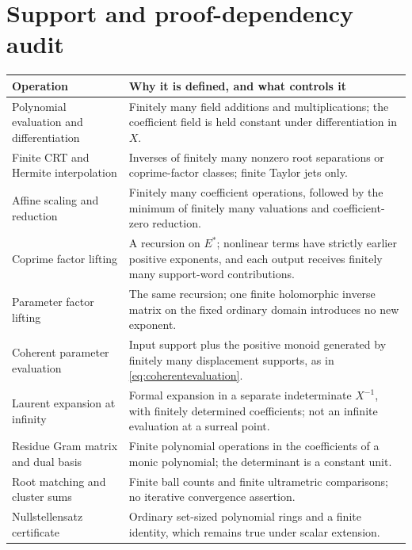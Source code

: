 \documentclass[11pt,letterpaper]{article}
\numberwithin{equation}{section}
\theoremstyle{definition}
\theoremstyle{remark}
\begin{document}
\section{Support and proof-dependency audit}\label{app:support}
\begin{longtable}{@{}P{0.36\textwidth}P{0.59\textwidth}@{}}
\toprule
Operation & Why it is defined, and what controls it\\
\midrule
\endhead
Polynomial evaluation and differentiation & Finitely many field additions and multiplications; the coefficient field is held constant under differentiation in $X$.\\[0.4em]
Finite CRT and Hermite interpolation & Inverses of finitely many nonzero root separations or coprime-factor classes; finite Taylor jets only.\\[0.4em]
Affine scaling and reduction & Finitely many coefficient operations, followed by the minimum of finitely many valuations and coefficient-zero reduction.\\[0.4em]
Coprime factor lifting & A recursion on $E^*$; nonlinear terms have strictly earlier positive exponents, and each output receives finitely many support-word contributions.\\[0.4em]
Parameter factor lifting & The same recursion; one finite holomorphic inverse matrix on the fixed ordinary domain introduces no new exponent.\\[0.4em]
Coherent parameter evaluation & Input support plus the positive monoid generated by finitely many displacement supports, as in \eqref{eq:coherentevaluation}.\\[0.4em]
Laurent expansion at infinity & Formal expansion in a separate indeterminate $X^{-1}$, with finitely determined coefficients; not an infinite evaluation at a surreal point.\\[0.4em]
Residue Gram matrix and dual basis & Finite polynomial operations in the coefficients of a monic polynomial; the determinant is a constant unit.\\[0.4em]
Root matching and cluster sums & Finite ball counts and finite ultrametric comparisons; no iterative convergence assertion.\\[0.4em]
Nullstellensatz certificate & Ordinary set-sized polynomial rings and a finite identity, which remains true under scalar extension.\\
\bottomrule
\end{longtable}
\end{document}
